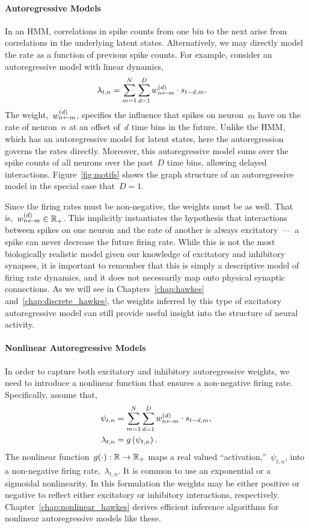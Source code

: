 \paragraph{Autoregressive Models}
In an HMM, correlations in spike counts from one bin to the next arise from 
correlations in the underlying latent states. Alternatively, we may directly 
model the rate as a function of previous spike counts. For example, consider 
an autoregressive model with linear dynamics,
\begin{align}
  \label{eq:ar_model}
  \lambda_{t,n} &= \sum_{m=1}^N \sum_{d=1}^D w_{n \leftarrow m}^{(d)} \cdot s_{t-d, m}.
\end{align}
The weight,~$w_{n \leftarrow m}^{(d)}$, specifies the influence that spikes
on neuron~$m$ have on the rate of neuron~$n$ at an offset of~$d$ time bins
in the future. 
Unlike the HMM, which has an
autoregressive model for latent states, here the
autoregression governs the rates directly.
Moreover, this
autoregressive model sums over the spike counts of all neurons over
the past~$D$ time bins, allowing delayed interactions.
Figure~\ref{fig:motifs} shows the graph structure of an autoregressive model
in the special case that~$D=1$.

Since the
firing rates must be non-negative, the weights must be as well.  That
is,~$w_{n \leftarrow m}^{(d)} \in \mathbb{R}_+$.
This implicitly instantiates
the hypothesis that interactions between spikes on one neuron and
the rate of another is always excitatory~---~a spike can never
decrease the future firing rate. While this is not the most
biologically realistic model given our knowledge of excitatory and
inhibitory synapses, it is important to remember that this is simply a
descriptive model of firing rate dynamics, and it does not necessarily
map onto physical synaptic connections. As we will see in
Chapters~\ref{chap:hawkes} and~\ref{chap:discrete_hawkes}, the weights
inferred by this type of excitatory autoregressive model can still
provide useful insight into the structure of neural activity.

\paragraph{Nonlinear Autoregressive Models}
In order to capture both excitatory and inhibitory autoregressive weights,
we need to introduce a nonlinear function that ensures a non-negative firing 
rate. Specifically, assume that,
\begin{align*}
  \psi_{t,n} &= \sum_{m=1}^N \sum_{d=1}^D w_{n \leftarrow m}^{(d)} \cdot s_{t-d,m}, \\
  \lambda_{t,n} &= g \left( \psi_{t,n} \right).
\end{align*}
The nonlinear
function~${g(\cdot): \mathbb{R} \to \mathbb{R}_+}$ 
maps a real valued ``activation,''~$\psi_{t,n}$, into a non-negative
firing rate,~$\lambda_{t,n}$. It is common to use an exponential or a
sigmoidal nonlinearity. In this formulation the
weights may be either positive
or negative to reflect either excitatory or inhibitory interactions,
respectively. Chapter~\ref{chap:nonlinear_hawkes} derives efficient
inference algorithms for nonlinear autoregressive models like these.

